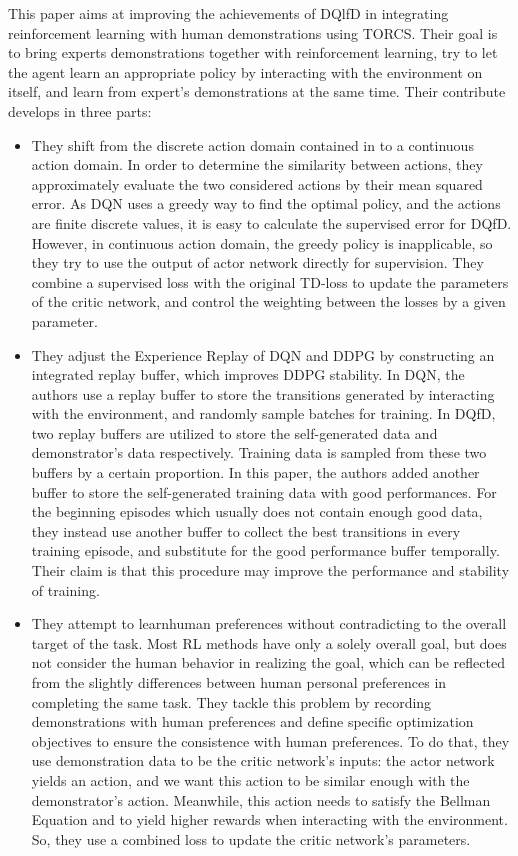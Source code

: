 This paper \cite{cinesi} aims at improving the achievements of DQlfD \cite{dqlfd} in integrating reinforcement learning with human demonstrations using TORCS.
Their goal is to bring experts demonstrations together with reinforcement learning, try to let the agent learn an appropriate policy by interacting with the environment on itself, and learn from expert’s demonstrations at the same time.
Their contribute develops in three parts:
\begin{itemize}
\item They shift from the discrete action domain contained in \cite{dqlfd} to a continuous action domain.
In order to determine the similarity between actions, they
approximately evaluate the two considered actions by their
mean squared error.  As DQN uses a greedy way to find the optimal policy, and the actions are finite discrete values, it is easy to calculate the supervised error for DQfD. However, in continuous action domain, the greedy policy is inapplicable, so they try to use the output of actor network directly for supervision. They combine a supervised loss with the original TD-loss to update the parameters of the critic network, and control the weighting between the losses by a given parameter.
\item They adjust the Experience Replay of DQN and DDPG by constructing an integrated replay buffer, which improves DDPG stability.  In DQN, the authors use a replay buffer to store the
transitions generated by interacting with the environment, and randomly sample batches for training. In DQfD, two replay buffers are utilized to store the self-generated data and demonstrator’s data respectively. Training data is sampled from these two buffers by a certain proportion. In this paper, the authors added another buffer to store the self-generated training data with good performances. 
For the beginning episodes which usually does not contain enough good data, they instead use another buffer to collect the best transitions in every training episode, and substitute for the good performance buffer temporally. 
Their claim is that this procedure may improve the performance and stability of training. 
\item  They attempt to learnhuman preferences without contradicting to the overall target of the task. Most RL methods have only a solely overall goal, but does not consider the human behavior in realizing
the goal, which can be reflected from the slightly differences
between human personal preferences in completing the same
task. They tackle this problem by recording demonstrations
with human preferences and define specific optimization
objectives to ensure the consistence with human preferences.
To do that, they use demonstration data to be the critic network’s inputs: the actor network yields an action, and we want this
action to be similar enough with the demonstrator’s action. Meanwhile, this action needs to satisfy the Bellman Equation and to yield higher rewards when interacting with the environment. So, they use a combined loss to update the critic network’s parameters.
\end{itemize}
